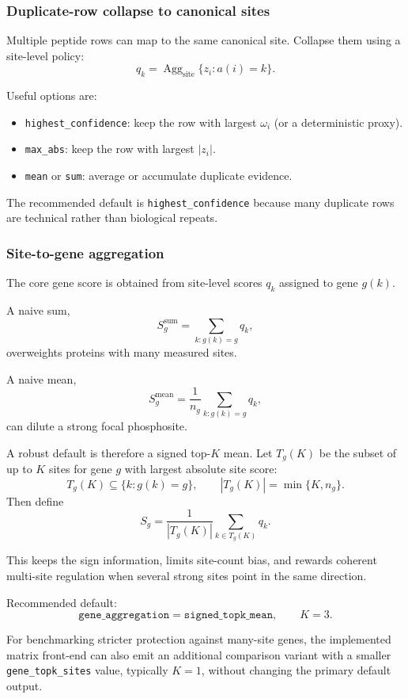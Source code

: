 \documentclass[11pt]{article}
\begin{document}
\subsubsection{Duplicate-row collapse to canonical sites}
Multiple peptide rows can map to the same canonical site. Collapse them using a
site-level policy:
\[
q_k = \operatorname{Agg}_{\mathrm{site}}
\{ z_i : a(i)=k \}.
\]

Useful options are:
\begin{itemize}
\item \texttt{highest\_confidence}: keep the row with largest
$\omega_i$ (or a deterministic proxy).
\item \texttt{max\_abs}: keep the row with largest $|z_i|$.
\item \texttt{mean} or \texttt{sum}: average or accumulate duplicate evidence.
\end{itemize}

The recommended default is \texttt{highest\_confidence} because many duplicate
rows are technical rather than biological repeats.

\subsubsection{Site-to-gene aggregation}
The core gene score is obtained from site-level scores $q_k$ assigned to gene
$g(k)$.

A naive sum,
\[
S_g^{\mathrm{sum}} = \sum_{k: g(k)=g} q_k,
\]
overweights proteins with many measured sites.

A naive mean,
\[
S_g^{\mathrm{mean}} = \frac{1}{n_g}\sum_{k: g(k)=g} q_k,
\]
can dilute a strong focal phosphosite.

A robust default is therefore a signed top-$K$ mean. Let
$T_g(K)$ be the subset of up to $K$ sites for gene $g$ with largest absolute
site score:
\[
T_g(K) \subseteq \{k : g(k)=g\}, \qquad
|T_g(K)| = \min\{K, n_g\}.
\]
Then define
\begin{equation}
S_g = \frac{1}{|T_g(K)|} \sum_{k \in T_g(K)} q_k.
\label{eq:ptm_signed_topk_mean}
\end{equation}

This keeps the sign information, limits site-count bias, and rewards coherent
multi-site regulation when several strong sites point in the same direction.

Recommended default:
\[
\texttt{gene\_aggregation} = \texttt{signed\_topk\_mean},
\qquad K = 3.
\]

For benchmarking stricter protection against many-site genes, the implemented
matrix front-end can also emit an additional comparison variant with a smaller
\texttt{gene\_topk\_sites} value, typically $K=1$, without changing the primary
default output.
\end{document}
